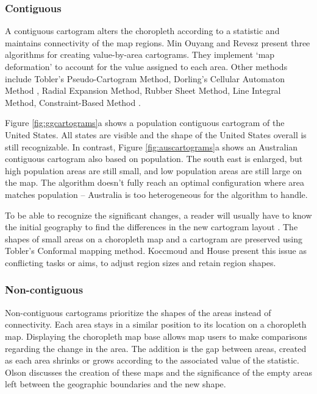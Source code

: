 \documentclass{monashthesis}
\begin{document}
\hypertarget{contiguous}{%
\subsubsection{Contiguous}\label{contiguous}}

A contiguous cartogram alters the choropleth according to a statistic and maintains connectivity of the map regions.
Min Ouyang and Revesz \autocite{ACA} present three algorithms for creating value-by-area cartograms. They implement `map deformation' to account for the value assigned to each area. Other methods include Tobler's Pseudo-Cartogram Method, Dorling's Cellular Automaton Method \autocite{ACTUC}, Radial Expansion Method, Rubber Sheet Method, Line Integral Method, Constraint-Based Method \autocite{CBATCC}.

Figure \ref{fig:ggcartograms}a shows a population contiguous cartogram of the United States. All states are visible and the shape of the United States overall is still recognizable. In contrast, Figure \ref{fig:auscartograms}a shows an Australian contiguous cartogram also based on population. The south east is enlarged, but high population areas are still small, and low population areas are still large on the map. The algorithm doesn't fully reach an optimal configuration where area matches population -- Australia is too heterogeneous for the algorithm to handle.

To be able to recognize the significant changes, a reader will usually have to know the initial geography to find the differences in the new cartogram layout \autocite{NAC}. The shapes of small areas on a choropleth map and a cartogram are preserved using Tobler's Conformal mapping method.
Koccmoud and House \autocite{CBATCC} present this issue as conflicting tasks or aims, to adjust region sizes and retain region shapes.

\hypertarget{non-contiguous}{%
\subsubsection{Non-contiguous}\label{non-contiguous}}

Non-contiguous cartograms prioritize the shapes of the areas instead of connectivity. Each area stays in a similar position to its location on a choropleth map. Displaying the choropleth map base allows map users to make comparisons regarding the change in the area. The addition is the gap between areas, created as each area shrinks or grows according to the associated value of the statistic. Olson \autocite{NAC} discusses the creation of these maps and the significance of the empty areas left between the geographic boundaries and the new shape.
\end{document}
